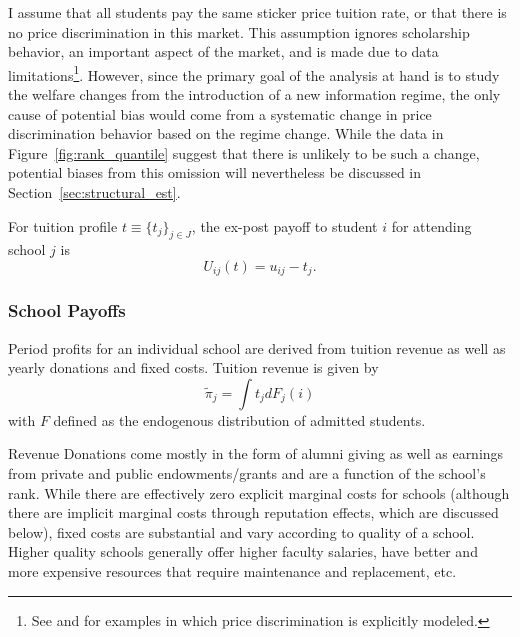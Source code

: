 \documentclass[12pt]{article}
\theoremstyle{definition}
\begin{document}
I assume that all students pay the same sticker price tuition rate, or that there is no price discrimination in this market. This assumption ignores scholarship behavior, an important aspect of the market, and is made due to data limitations\footnote{See \cite{Fu} and \cite{Fillmore} for examples in which price discrimination is explicitly modeled.}. However, since the primary goal of the analysis at hand is to study the welfare changes from the introduction of a new information regime, the only cause of potential bias would come from a systematic change in price discrimination behavior based on the regime change. While the data in Figure~\ref{fig:rank_quantile} suggest that there is unlikely to be such a change, potential biases from this omission will nevertheless be discussed in Section~\ref{sec:structural_est}.

For tuition profile $t\equiv\{t_j\}_{j\in J}$, the ex-post payoff to student $i$ for attending school $j$ is
\begin{equation}
  U_{ij}(t) = u_{ij} - t_j.
\end{equation}



\subsubsection{School Payoffs}
\label{sec:school_payoffs}

Period profits for an individual school are derived from tuition revenue as well as yearly donations and fixed costs. Tuition revenue is given by
\begin{equation}
  \tilde{\pi}_j = \int t_j dF_j(i)
  \label{eq:tuition_rev}
\end{equation}
with $F$ defined as the endogenous distribution of admitted students.

Revenue Donations come mostly in the form of alumni giving as well as earnings from private and public endowments/grants and are a function of the school's rank. While there are effectively zero explicit marginal costs for schools (although there are implicit marginal costs through reputation effects, which are discussed below), fixed costs are substantial and vary according to quality of a school. Higher quality schools generally offer higher faculty salaries, have better and more expensive resources that require maintenance and replacement, etc.
\end{document}
